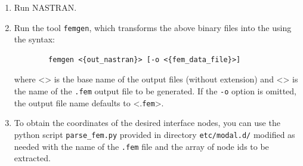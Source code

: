 \begin{enumerate}
\begin{enumerate}
		\emph{Note: this works; see} \texttt{tests/joints/modal/beam.README} and 
		\texttt{tests/joints/modal/goland-wing}.

	\item \texttt{MBDyn\_NASTRAN\_alter\_SOL106\_2024.nas} contains
		 definitions for a non-linear static analysis followed by an 
		eigenanalysis solutions (SOL106);

		\emph{Note: this works; see} \texttt{tests/joints/modal/shell-blade}

	\end{enumerate}

	Exactly one of these files must be included at the very top 
	of the NASTRAN input file. 
	They already include the appropriate  statement, so the
	input file must begin with: 
	\begin{verbatim}
		$ Replace '#' below with number that matches your needs
		INCLUDE 'MBDyn_NASTRAN_alter_#.nas'
		CEND
		$... any other executive control and bulk data card
	\end{verbatim}

	Both  and  produce one binary file  which
	contains the modal mass and stiffness matrices and the lumped nodal masses.  
	The deformed configuration and the mode shapes are written in the \texttt{.op2} file. 
\item Run NASTRAN.

\item Run the tool \texttt{femgen}, which transforms the above binary files
	into the  using the syntax: 
	\begin{verbatim}
		femgen <{out_nastran}> [-o <{fem_data_file}>]   	
	\end{verbatim}
	where <> is the base name of the output files (without extension) 
	and <> is the name of the \texttt{.fem} output file to be generated.
	If the \texttt{-o} option is omitted, the output file name defaults to
	<.\texttt{fem}>. 

\item To obtain the coordinates of the desired interface nodes, you can use the python script
	\texttt{parse\_fem.py} provided in directory \texttt{etc/modal.d/} modified as needed with the
	name of the \texttt{.fem} file and the array of node ids to be extracted. 

\end{enumerate} %


